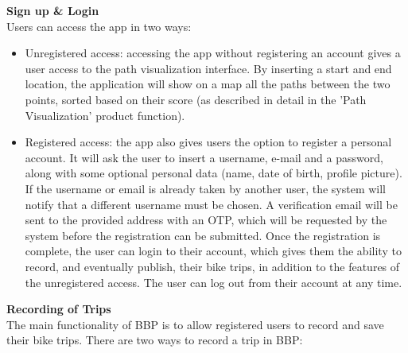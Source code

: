 \textbf{Sign up \& Login} \\
Users can access the app in two ways: 
\begin{itemize}
    \item Unregistered access: accessing the app without registering an account gives a user access to the 
    path visualization interface. By inserting a start and end location, the application will show on a map 
    all the paths between the two points, sorted based on their score (as described in detail in the 'Path 
    Visualization' product function).
    \item Registered access: the app also gives users the option to register a personal account. It will ask 
    the user to insert a username, e-mail and a password, along with some optional personal data (name, date 
    of birth, profile picture). If the username or email is already taken by another user, the system will 
    notify that a different username must be chosen. A verification email will be sent to the provided address 
    with an OTP, which will be requested by the system before the registration can be submitted. Once the 
    registration is complete, the user can login to their account, which gives them the ability to record, and 
    eventually publish, their bike trips, in addition to the features of the unregistered access. The user can 
    log out from their account at any time. \\
\end{itemize}
\textbf{Recording of Trips} \\
The main functionality of BBP is to allow registered users to record and save their bike trips.
There are two ways to record a trip in BBP:
